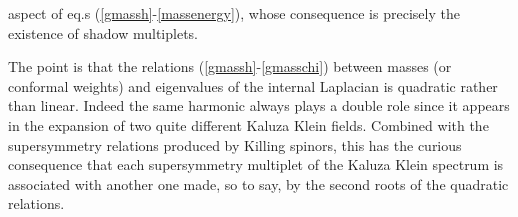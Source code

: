 \documentclass[a4paper,11pt]{article}
\begin{document}
aspect of eq.s (\ref{gmassh}-\ref{massenergy}), whose consequence
is precisely the existence of shadow multiplets.
\par
The point is that the relations (\ref{gmassh}-\ref{gmasschi})
between masses (or conformal weights) and eigenvalues of the
internal Laplacian is quadratic rather than linear. Indeed the
same harmonic always  plays a double role since it appears in the
expansion of two quite different Kaluza Klein fields. Combined
with the supersymmetry relations produced by Killing spinors, this
has the curious consequence that each supersymmetry multiplet of
the Kaluza Klein spectrum is associated with another one made, so
to say, by the second roots of the quadratic relations.
%
%
\end{document}

